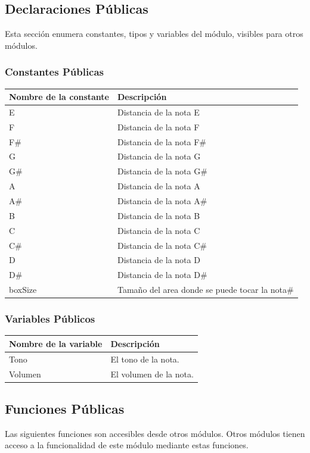 \documentclass[a4paper,10pt]{article}
\begin{document}
\subsection{Declaraciones Públicas}
Esta sección enumera constantes, tipos y variables del módulo, visibles para
otros módulos.
\subsubsection{Constantes Públicas}
\begin{tabular}{| p{30mm} | p{10cm} |}
        \hline
        \textbf{Nombre de la \mbox{constante}} & \textbf{Descripción} \\
        \hline
        E & Distancia de la nota E\\
        F & Distancia de la nota F\\
        F\# & Distancia de la nota F\#\\
        G & Distancia de la nota G\\
        G\# & Distancia de la nota G\#\\
        A & Distancia de la nota A\\
        A\# & Distancia de la nota A\#\\
        B & Distancia de la nota B\\
        C & Distancia de la nota C\\
        C\# & Distancia de la nota C\#\\
        D & Distancia de la nota D\\
        D\# & Distancia de la nota D\#\\
         boxSize & Tamaño del area donde se puede tocar la nota\#\\
        \hline
\end{tabular}

                

\subsubsection{Variables Públicos}
\begin{tabular}{| p{30mm} | p{10cm} |}
        \hline
        \textbf{Nombre de la \mbox{variable}} & \textbf{Descripción} \\
        \hline
        Tono & El tono de la nota.\\
        Volumen & El volumen de la nota.\\
        \hline
\end{tabular}
\subsection{Funciones Públicas}
Las siguientes funciones son accesibles desde otros módulos. Otros módulos
tienen acceso a la funcionalidad de este módulo mediante estas funciones.
~\\
\end{document}
